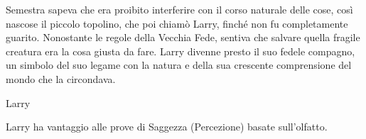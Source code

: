 \documentclass[letterpaper,twocolumn,openany,nodeprecatedcode]{dndbook}
\begin{document}
Semestra sapeva che era proibito interferire con il corso naturale delle cose, così nascose il piccolo topolino, che poi chiamò Larry, finché non fu completamente guarito. Nonostante le regole della Vecchia Fede, sentiva che salvare quella fragile creatura era la cosa giusta da fare. Larry divenne presto il suo fedele compagno, un simbolo del suo legame con la natura e della sua crescente comprensione del mondo che la circondava.
\begin{DndMonster}[float*=b,width=\textwidth + 8pt]{Larry}
  \begin{multicols}{2}

    \DndMonsterBasics[
        armor-class = {10 (armatura naturale)},
        hit-points  = {1 (\DndDice{1d4 - 1})},
        speed       = {6m},
      ]

    \DndMonsterAbilityScores[
        str = 2,
        dex = 11,
        con = 9,
        int = 10,
        wis = 10,
        cha = 4,
      ]

    \DndMonsterDetails[
        senses = {Scurovisione 9m, Percezione Passiva 10},
        languages = {Comprende il Comune},
        challenge = 0,
      ]
     Larry ha vantaggio alle prove di Saggezza (Percezione) basate sull'olfatto.
    \DndMonsterMelee[
      name=Morso,
      distance=melee, %
      type=weapon, %
      mod=+0,
      targets=one target,
      dmg=1,
      dmg-type=piercing,
    ]

    
  \end{multicols}
\end{DndMonster}
\end{document}
